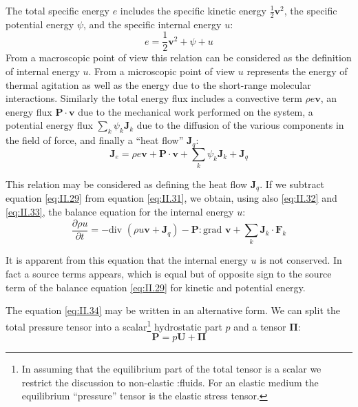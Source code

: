The total specific energy $e$ includes the specific kinetic energy $\frac{1}{2} \bm{v}^2$, the specific potential energy $\psi$, and the specific internal energy $u$:
\begin{equation}
e = \frac{1}{2} \bm{v}^2 + \psi + u
    \label{eq:II.32}
\end{equation}
From a macroscopic point of view this relation can be considered as
the definition of internal energy $u$. From a microscopic point of view $u$ represents the energy of thermal agitation as well as the energy due
to the short-range molecular interactions. Similarly the total energy
flux includes a convective term $\rho e \bm{v}$, an energy flux $\bm{P} \cdot \bm{v}$ due to the mechanical work performed on the system, a potential energy flux $\sum_k \psi_k \bm{J}_k$ due to the diffusion of the various components in the field of force, and finally a ``heat flow'' $\bm{J}_q$:
\begin{equation}
    \bm{J}_e = \rho e \bm{v} + \bm{P} \cdot \bm{v} + \sum_k \psi_k \bm{J}_k + \bm{J}_q
    \label{eq:II.33}
\end{equation}

This relation may be considered as defining the heat flow $\bm{J}_q$. If we subtract equation \eqref{eq:II.29} from equation \eqref{eq:II.31}, we obtain, using also \eqref{eq:II.32} and \eqref{eq:II.33}, the balance equation for the internal energy $u$:
\begin{equation}
\frac{\partial \rho u}{\partial t} = - \textrm{div } \left( \rho u \bm{v} + \bm{J}_q \right) - \bm{P} : \textrm{grad } \bm{v} + \sum_k \bm{J}_k \cdot \bm{F}_k
    \label{eq:II.34}
\end{equation}

It is apparent from this equation that the internal energy $u$ is not
conserved. In fact a source terms appears, which is equal but of
opposite sign to the source term of the balance equation \eqref{eq:II.29} for kinetic and potential energy.

The equation \eqref{eq:II.34} may be written in an alternative form. We can split the total pressure tensor into a scalar\footnote{In assuming that the equilibrium part of the total tensor is a scalar we
restrict the discussion to non-elastic :fluids. For an elastic medium the equilibrium ``pressure'' tensor is the elastic stress tensor.} hydrostatic part $p$ and a tensor $\bm{\Pi}$:
\begin{equation}
\bm{P} = p \bm{U} + \bm{\Pi}
    \label{eq:II.35}
\end{equation}

